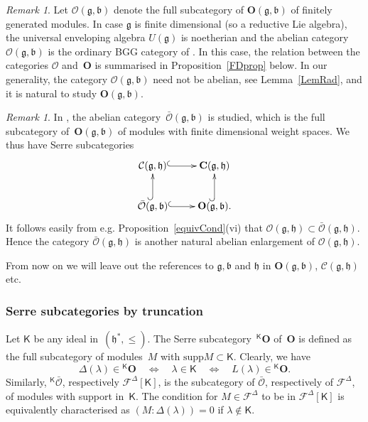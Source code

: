 \documentclass[11pt]{amsart}
\newcommand{\KKK}{\mathsf{K}}
\newcommand{\cF}{{\mathcal{F}}}
\newcommand{\supp}{\mathrm{supp}}
\newcommand{\cO}{\mathcal O}
\newcommand{\bO}{\mathbf{O}}
\newcommand{\bC}{\mathbf{C}}
\newcommand{\Ext}{\mathrm{Ext}}
\newcommand{\cC}{\mathcal{C}}
\newcommand{\fg}{\mathfrak{g}}
\newcommand{\fh}{\mathfrak{h}}
\newcommand{\fb}{\mathfrak{b}}
\numberwithin{equation}{section}
\theoremstyle{plain}
\theoremstyle{remark}
\newtheorem{rem}[subsubsection]{Remark}
\theoremstyle{remark}
\theoremstyle{construction}
\begin{document}


\begin{rem}
Let $\cO(\fg,\fb)$ denote the full subcategory of $\bO(\fg,\fb)$ of finitely generated modules.
In case $\fg$ is finite dimensional (so a reductive Lie algebra){,} the universal enveloping algebra $U(\fg)$ is noetherian and the abelian category $\cO(\fg,\fb)$ is the ordinary BGG category  of \cite{BGG, Humphreys}. In this case, the relation between the categories $\cO$ and~$\bO$ is summarised in Proposition~\ref{FDprop} below. In our generality, the category $\cO(\fg,\fb)$ need not be abelian, see Lemma~\ref{LemRad}, and it is natural to study $\bO(\fg,\fb)$.
\end{rem}

\begin{rem}
In \cite{Nam}, the abelian category~$\bar{\cO}(\fg,\fb)$ is studied, which is the full subcategory of~$\bO(\fg,\fb)$ of modules with finite dimensional weight spaces. We thus have Serre subcategories
$$\xymatrix{
\cC(\fg,\fh) \ar@{^{(}->}[r]&\bC(\fg,\fh)\\
\bar{\cO}(\fg,\fb)\ar@{^{(}->}[r]\ar@{^{(}->}[u]& \bO(\fg,\fb).\ar@{^{(}->}[u]
} 
$$
It follows easily from e.g. Proposition~\ref{equivCond}(vi) that $\cO(\fg,\fh)\subset \bar{\cO}(\fg,\fh)$. Hence  the category $\bar{\cO}(\fg,\fh)$ is another natural abelian enlargement of $\cO(\fg,\fh)$.

\end{rem}

From now on we will leave out the references to $\fg,\fb$ and $\fh$ in $\bO(\fg,\fb)$, $\cC(\fg,\fh)$ etc.


\subsubsection{Serre subcategories by truncation}
Let $\KKK$ be any ideal in~$(\fh^\ast,\le)$. The Serre subcategory~${}^{\KKK}\bO$ of~$\bO$ is defined as the full subcategory of modules~$M$ with $\supp M \subset\KKK$. Clearly, we have 
\begin{equation}\label{eqDtrunc}\Delta(\lambda)\in {}^{\KKK}\bO\quad\Leftrightarrow\quad \lambda\in\KKK\quad\Leftrightarrow\quad L(\lambda)\in{}^{\KKK}\bO.\end{equation}
Similarly, ${}^{\KKK}\bar{\cO}$, respectively $\cF^\Delta[\KKK]$, is the subcategory of $\bar{\cO}$, respectively {of} $\cF^\Delta$, of modules with support in~$\KKK$. The condition for $M\in\cF^\Delta$ to be in $\cF^\Delta[\KKK]$ is equivalently characterised as $(M:\Delta(\lambda))=0$ if $\lambda\not\in\KKK$.
\end{document}
